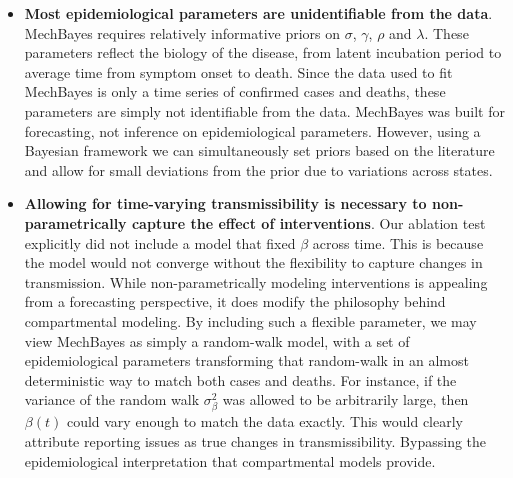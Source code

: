 \documentclass[11pt]{amsart}
\begin{document}
\begin{itemize}

\item \textbf{Most epidemiological parameters are unidentifiable from the data}. MechBayes requires relatively informative priors on $\sigma$, $\gamma$, $\rho$ and $\lambda$. These parameters reflect the biology of the disease, from latent incubation period to average time from symptom onset to death. Since the data used to fit MechBayes is only a time series of confirmed cases and deaths, these parameters are simply not identifiable from the data. MechBayes was built for forecasting, not inference on epidemiological parameters. However, using a Bayesian framework we can simultaneously set priors based on the literature and allow for small deviations from the prior due to variations across states. 




\item \textbf{Allowing for time-varying transmissibility is necessary to non-parametrically capture the effect of  interventions}. Our ablation test explicitly did not include a model that fixed $\beta$ across time. This is because the model would not converge without the flexibility to capture changes in transmission. While non-parametrically modeling interventions is appealing from a forecasting perspective, it does modify the philosophy behind compartmental modeling. By including such a flexible parameter, we may view MechBayes as simply a random-walk model, with a set of epidemiological parameters transforming that random-walk in an almost deterministic way to match both cases and deaths. For instance, if the variance of the random walk $\sigma_{\beta}^2$ was allowed to be arbitrarily large, then $\beta(t)$ could vary enough to match the data exactly. This would clearly attribute reporting issues as true changes in transmissibility. Bypassing the epidemiological interpretation that compartmental models provide. 


\end{itemize}
\end{document}

